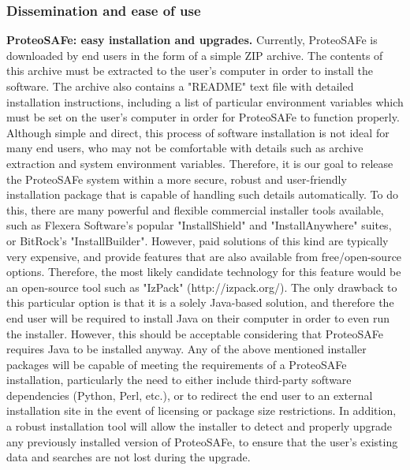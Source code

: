 \documentclass[arial,11pt]{article}
\begin{document}
\subsubsection{Dissemination and ease of use}

{\bf ProteoSAFe: easy installation and upgrades.} Currently, ProteoSAFe is downloaded by end users in the form of a simple ZIP archive.  The contents of this archive must be extracted to the user's computer in order to install the software.  The archive also contains a "README" text file with detailed installation instructions, including a list of particular environment variables which must be set on the user's computer in order for ProteoSAFe to function properly.
%
Although simple and direct, this process of software installation is not ideal for many end users, who may not be comfortable with details such as archive extraction and system environment variables.  Therefore, it is our goal to release the ProteoSAFe system within a more secure, robust and user-friendly installation package that is capable of handling such details automatically.
%
To do this, there are many powerful and flexible commercial installer tools available, such as Flexera Software's popular "InstallShield" and "InstallAnywhere" suites, or BitRock's "InstallBuilder".  However, paid solutions of this kind are typically very expensive, and provide features that are also available from free/open-source options.  Therefore, the most likely candidate technology for this feature would be an open-source tool such as "IzPack" (http://izpack.org/).
%
The only drawback to this particular option is that it is a solely Java-based solution, and therefore the end user will be required to install Java on their computer in order to even run the installer.  However, this should be acceptable considering that ProteoSAFe requires Java to be installed anyway.
%
Any of the above mentioned installer packages will be capable of meeting the requirements of a ProteoSAFe installation, particularly the need to either include third-party software dependencies (Python, Perl, etc.), or to redirect the end user to an external installation site in the event of licensing or package size restrictions. In addition, a robust installation tool will allow the installer to detect and properly upgrade any previously installed version of ProteoSAFe, to ensure that the user's existing data and searches are not lost during the upgrade.

\end{document}
